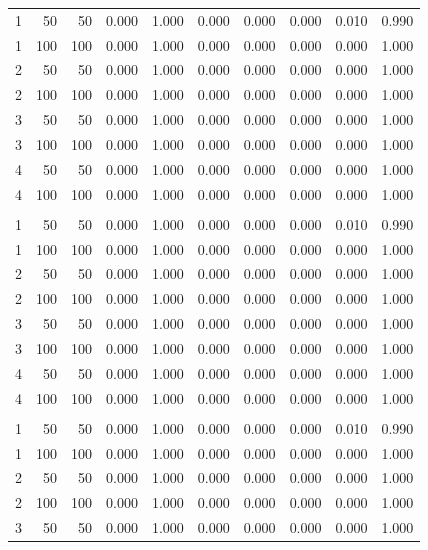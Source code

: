 \begin{longtable}{rrrrrrrrrr}
1 & 50 & 50 & 0.000 & 1.000 & 0.000 & 0.000 & 0.000 & 0.010 & 0.990 \\
1 & 100 & 100 & 0.000 & 1.000 & 0.000 & 0.000 & 0.000 & 0.000 & 1.000 \\
2 & 50 & 50 & 0.000 & 1.000 & 0.000 & 0.000 & 0.000 & 0.000 & 1.000 \\
2 & 100 & 100 & 0.000 & 1.000 & 0.000 & 0.000 & 0.000 & 0.000 & 1.000 \\
3 & 50 & 50 & 0.000 & 1.000 & 0.000 & 0.000 & 0.000 & 0.000 & 1.000 \\
3 & 100 & 100 & 0.000 & 1.000 & 0.000 & 0.000 & 0.000 & 0.000 & 1.000 \\
4 & 50 & 50 & 0.000 & 1.000 & 0.000 & 0.000 & 0.000 & 0.000 & 1.000 \\
4 & 100 & 100 & 0.000 & 1.000 & 0.000 & 0.000 & 0.000 & 0.000 & 1.000 \\
\addlinespace
\multicolumn{10}{l}{\textit{Panel I. Autoregressive coefficient, full-panel mean---corrected}} \\
1 & 50 & 50 & 0.000 & 1.000 & 0.000 & 0.000 & 0.000 & 0.010 & 0.990 \\
1 & 100 & 100 & 0.000 & 1.000 & 0.000 & 0.000 & 0.000 & 0.000 & 1.000 \\
2 & 50 & 50 & 0.000 & 1.000 & 0.000 & 0.000 & 0.000 & 0.000 & 1.000 \\
2 & 100 & 100 & 0.000 & 1.000 & 0.000 & 0.000 & 0.000 & 0.000 & 1.000 \\
3 & 50 & 50 & 0.000 & 1.000 & 0.000 & 0.000 & 0.000 & 0.000 & 1.000 \\
3 & 100 & 100 & 0.000 & 1.000 & 0.000 & 0.000 & 0.000 & 0.000 & 1.000 \\
4 & 50 & 50 & 0.000 & 1.000 & 0.000 & 0.000 & 0.000 & 0.000 & 1.000 \\
4 & 100 & 100 & 0.000 & 1.000 & 0.000 & 0.000 & 0.000 & 0.000 & 1.000 \\
\addlinespace
\multicolumn{10}{l}{\textit{Panel J. Slope coefficient, fixed-time group 1 mean}} \\
1 & 50 & 50 & 0.000 & 1.000 & 0.000 & 0.000 & 0.000 & 0.010 & 0.990 \\
1 & 100 & 100 & 0.000 & 1.000 & 0.000 & 0.000 & 0.000 & 0.000 & 1.000 \\
2 & 50 & 50 & 0.000 & 1.000 & 0.000 & 0.000 & 0.000 & 0.000 & 1.000 \\
2 & 100 & 100 & 0.000 & 1.000 & 0.000 & 0.000 & 0.000 & 0.000 & 1.000 \\
3 & 50 & 50 & 0.000 & 1.000 & 0.000 & 0.000 & 0.000 & 0.000 & 1.000 \\

\end{longtable}

